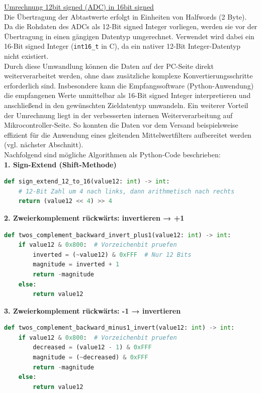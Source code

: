 \documentclass[a4paper, portrait, 12pt]{scrartcl} %
\begin{document}
\underline{Umrechnung 12bit signed (ADC) in 16bit signed}\\
Die Übertragung der Abtastwerte erfolgt in Einheiten von Halfwords (2 Byte). Da die Rohdaten des ADCs als 12-Bit signed Integer vorliegen, werden sie vor der Übertragung in einen gängigen Datentyp umgerechnet. Verwendet wird dabei ein 16-Bit signed Integer (\texttt{int16\_t} in C), da ein nativer 12-Bit Integer-Datentyp nicht existiert.\\
Durch diese Umwandlung können die Daten auf der PC-Seite direkt weiterverarbeitet werden, ohne dass zusätzliche komplexe Konvertierungsschritte erforderlich sind. Insbesondere kann die Empfangssoftware (Python-Anwendung) die empfangenen Werte unmittelbar als 16-Bit signed Integer interpretieren und anschließend in den gewünschten Zieldatentyp umwandeln. Ein weiterer Vorteil der Umrechnung liegt in der verbesserten internen Weiterverarbeitung auf Mikrocontroller-Seite. So konnten die Daten vor dem Versand beispielsweise effizient für die Anwendung eines gleitenden Mittelwertfilters aufbereitet werden (vgl. nächster Abschnitt).\\

Nachfolgend sind mögliche Algorithmen als Python-Code beschrieben:\\

\textbf{1. Sign-Extend (Shift-Methode)}
\begin{lstlisting}[language=Python, caption=Sign-extend (Arithmetisches Shift schiebt das MSB nach)]
def sign_extend_12_to_16(value12: int) -> int:
    # 12-Bit Zahl um 4 nach links, dann arithmetisch nach rechts
    return (value12 << 4) >> 4
\end{lstlisting}

\textbf{2. Zweierkomplement rückwärts: invertieren → +1}
\begin{lstlisting}[language=Python, caption=Zweierkomplement rückwärts aufgelöst.]
def twos_complement_backward_invert_plus1(value12: int) -> int:
	if value12 & 0x800:  # Vorzeichenbit pruefen
		inverted = (~value12) & 0xFFF  # Nur 12 Bits
		magnitude = inverted + 1
		return -magnitude
	else:
		return value12
\end{lstlisting}

\pagebreak

\textbf{3. Zweierkomplement rückwärts: -1 → invertieren}
\begin{lstlisting}[language=Python, caption={Alternative zu 2.: Erst -1 $\rightarrow$ dann invertieren.}, label={lst:reverse_2s_compl_v2}]
def twos_complement_backward_minus1_invert(value12: int) -> int:
	if value12 & 0x800:  # Vorzeichenbit pruefen
		decreased = (value12 - 1) & 0xFFF
		magnitude = (~decreased) & 0xFFF
		return -magnitude
	else:
		return value12
\end{lstlisting}
\end{document}
